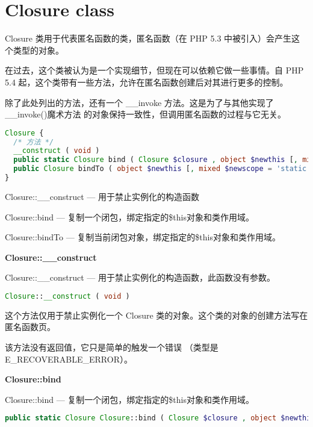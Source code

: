 \section{Closure class}


Closure 类用于代表匿名函数的类，匿名函数（在 PHP 5.3 中被引入）会产生这个类型的对象。

在过去，这个类被认为是一个实现细节，但现在可以依赖它做一些事情。自 PHP 5.4 起，这个类带有一些方法，允许在匿名函数创建后对其进行更多的控制。

除了此处列出的方法，还有一个 \_\_invoke 方法。这是为了与其他实现了 \_\_invoke()魔术方法 的对象保持一致性，但调用匿名函数的过程与它无关。

\begin{lstlisting}[language=PHP]
Closure {
  /* 方法 */
  __construct ( void )
  public static Closure bind ( Closure $closure , object $newthis [, mixed $newscope = 'static' ] )
  public Closure bindTo ( object $newthis [, mixed $newscope = 'static' ] )
}
\end{lstlisting}

\begin{compactitem}
\item Closure::\_\_construct — 用于禁止实例化的构造函数
\item Closure::bind — 复制一个闭包，绑定指定的\$this对象和类作用域。
\item Closure::bindTo — 复制当前闭包对象，绑定指定的\$this对象和类作用域。
\end{compactitem}


\textbf{Closure::\_\_construct}

Closure::\_\_construct — 用于禁止实例化的构造函数，此函数没有参数。

\begin{lstlisting}[language=PHP]
Closure::__construct ( void )
\end{lstlisting}

这个方法仅用于禁止实例化一个 Closure 类的对象。这个类的对象的创建方法写在匿名函数页。


该方法没有返回值，它只是简单的触发一个错误 （类型是 E\_RECOVERABLE\_ERROR）。

\textbf{Closure::bind}

Closure::bind — 复制一个闭包，绑定指定的\$this对象和类作用域。

\begin{lstlisting}[language=PHP]
public static Closure Closure::bind ( Closure $closure , object $newthis [, mixed $newscope = 'static' ] )
\end{lstlisting}

